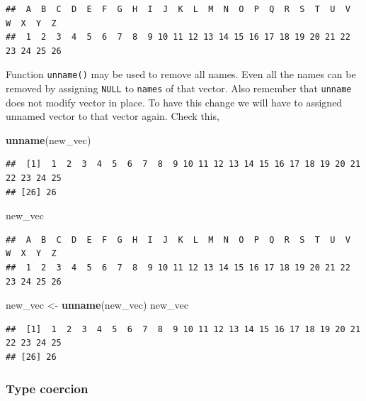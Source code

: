 \documentclass[
]{book}
\newenvironment{Shaded}{\begin{snugshade}}{\end{snugshade}}
\newcommand{\FunctionTok}[1]{\textcolor[rgb]{0.13,0.29,0.53}{\textbf{#1}}}
\newcommand{\NormalTok}[1]{#1}
\newcommand{\OtherTok}[1]{\textcolor[rgb]{0.56,0.35,0.01}{#1}}
\begin{document}
\begin{verbatim}
##  A  B  C  D  E  F  G  H  I  J  K  L  M  N  O  P  Q  R  S  T  U  V  W  X  Y  Z 
##  1  2  3  4  5  6  7  8  9 10 11 12 13 14 15 16 17 18 19 20 21 22 23 24 25 26
\end{verbatim}

Function \texttt{unname()} may be used to remove all names. Even all the names can be removed by assigning \texttt{NULL} to \texttt{names} of that vector. Also remember that \texttt{unname} does not modify vector in place. To have this change we will have to assigned unnamed vector to that vector again. Check this,

\begin{Shaded}
\begin{Highlighting}[]
\FunctionTok{unname}\NormalTok{(new\_vec)}
\end{Highlighting}
\end{Shaded}

\begin{verbatim}
##  [1]  1  2  3  4  5  6  7  8  9 10 11 12 13 14 15 16 17 18 19 20 21 22 23 24 25
## [26] 26
\end{verbatim}

\begin{Shaded}
\begin{Highlighting}[]
\NormalTok{new\_vec}
\end{Highlighting}
\end{Shaded}

\begin{verbatim}
##  A  B  C  D  E  F  G  H  I  J  K  L  M  N  O  P  Q  R  S  T  U  V  W  X  Y  Z 
##  1  2  3  4  5  6  7  8  9 10 11 12 13 14 15 16 17 18 19 20 21 22 23 24 25 26
\end{verbatim}

\begin{Shaded}
\begin{Highlighting}[]
\NormalTok{new\_vec }\OtherTok{\textless{}{-}} \FunctionTok{unname}\NormalTok{(new\_vec)}
\NormalTok{new\_vec}
\end{Highlighting}
\end{Shaded}

\begin{verbatim}
##  [1]  1  2  3  4  5  6  7  8  9 10 11 12 13 14 15 16 17 18 19 20 21 22 23 24 25
## [26] 26
\end{verbatim}

\hypertarget{type-coercion}{%
\subsubsection*{Type coercion}\label{type-coercion}}
\end{document}
